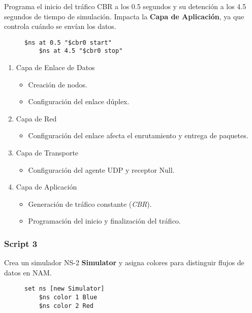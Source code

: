 \noindent Programa el inicio del tr\'afico CBR a los 0.5 segundos y su detenci\'on a los 4.5 segundos de tiempo de simulaci\'on. Impacta la
\textbf{Capa de Aplicaci\'on}, ya que controla cu\'ando se env\'ian los datos.
\begin{figure}[H]
  \begin{lstlisting}[frame=single, breaklines=true, basicstyle=\footnotesize\ttfamily, breakatwhitespace=false, 
    columns=flexible, tabsize=2, showstringspaces=false]
    $ns at 0.5 "$cbr0 start"
    $ns at 4.5 "$cbr0 stop"    
  \end{lstlisting}
\end{figure}

\begin{enumerate}
  \item Capa de Enlace de Datos
  \begin{itemize}
    \item Creaci\'on de nodos.
    \item Configuraci\'on del enlace d\'uplex.
  \end{itemize}

  \item Capa de Red
  \begin{itemize}
    \item Configuraci\'on del enlace afecta el enrutamiento y entrega de paquetes.
  \end{itemize}

  \item Capa de Transporte
  \begin{itemize}
    \item Configuraci\'on del agente UDP y receptor Null.
  \end{itemize}

  \item Capa de Aplicaci\'on
  \begin{itemize}
    \item Generaci\'on de tr\'afico constante (\textit{CBR}).
    \item Programaci\'on del inicio y finalizaci\'on del tr\'afico.
  \end{itemize}
\end{enumerate}

\subsubsection*{Script 3}

\noindent Crea un simulador NS-2 \textbf{Simulator} y asigna colores para distinguir flujos de datos en NAM.
\begin{figure}[H]
  \begin{lstlisting}[frame=single, breaklines=true, basicstyle=\footnotesize\ttfamily, breakatwhitespace=false, 
    columns=flexible, tabsize=2, showstringspaces=false]
    set ns [new Simulator]
    $ns color 1 Blue
    $ns color 2 Red  
  \end{lstlisting}
\end{figure}


